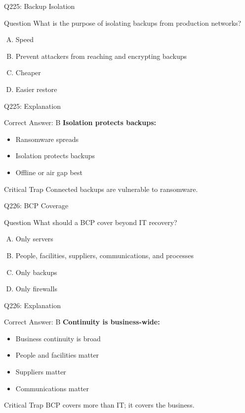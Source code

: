 \documentclass{beamer}
\begin{document}
	\begin{frame}{Q225: Backup Isolation}
		\begin{block}{Question}
			What is the purpose of isolating backups from production networks?
		\end{block}
		\begin{enumerate}[(A)]
			\item Speed
			\item Prevent attackers from reaching and encrypting backups
			\item Cheaper
			\item Easier restore
		\end{enumerate}
	\end{frame}
	
	\begin{frame}{Q225: Explanation}
		\begin{block}{Correct Answer: B}
			\textbf{Isolation protects backups:}
			\begin{itemize}
				\item Ransomware spreads
				\item Isolation protects backups
				\item Offline or air gap best
			\end{itemize}
		\end{block}
		\begin{alertblock}{Critical Trap}
			Connected backups are vulnerable to ransomware.
		\end{alertblock}
	\end{frame}
	
	\begin{frame}{Q226: BCP Coverage}
		\begin{block}{Question}
			What should a BCP cover beyond IT recovery?
		\end{block}
		\begin{enumerate}[(A)]
			\item Only servers
			\item People, facilities, suppliers, communications, and processes
			\item Only backups
			\item Only firewalls
		\end{enumerate}
	\end{frame}
	
	\begin{frame}{Q226: Explanation}
		\begin{block}{Correct Answer: B}
			\textbf{Continuity is business-wide:}
			\begin{itemize}
				\item Business continuity is broad
				\item People and facilities matter
				\item Suppliers matter
				\item Communications matter
			\end{itemize}
		\end{block}
		\begin{alertblock}{Critical Trap}
			BCP covers more than IT; it covers the business.
		\end{alertblock}
	\end{frame}
	
\end{document}
